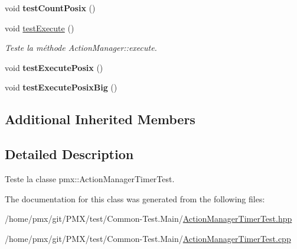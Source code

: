 \begin{DoxyCompactItemize}
void {\bfseries test\+Count\+Posix} ()
\item 
\mbox{\label{classtest_1_1ActionManagerTimerTest_affc3baf9814b3cd622f7bd904c34b30c}} 
void \hyperlink{classtest_1_1ActionManagerTimerTest_affc3baf9814b3cd622f7bd904c34b30c}{test\+Execute} ()
\begin{DoxyCompactList}\small\item\em Teste la méthode Action\+Manager\+::execute. \end{DoxyCompactList}\item 
\mbox{\label{classtest_1_1ActionManagerTimerTest_a64cdca111a2911244823561f021f9154}} 
void {\bfseries test\+Execute\+Posix} ()
\item 
\mbox{\label{classtest_1_1ActionManagerTimerTest_a3ab8fb0a0e68110e5c7e1ce69cdb2ef4}} 
void {\bfseries test\+Execute\+Posix\+Big} ()
\end{DoxyCompactItemize}
\subsection*{Additional Inherited Members}


\subsection{Detailed Description}
Teste la classe pmx\+::\+Action\+Manager\+Timer\+Test. 

The documentation for this class was generated from the following files\+:\begin{DoxyCompactItemize}
\item 
/home/pmx/git/\+P\+M\+X/test/\+Common-\/\+Test.\+Main/\hyperlink{ActionManagerTimerTest_8hpp}{Action\+Manager\+Timer\+Test.\+hpp}\item 
/home/pmx/git/\+P\+M\+X/test/\+Common-\/\+Test.\+Main/\hyperlink{ActionManagerTimerTest_8cpp}{Action\+Manager\+Timer\+Test.\+cpp}\end{DoxyCompactItemize}
